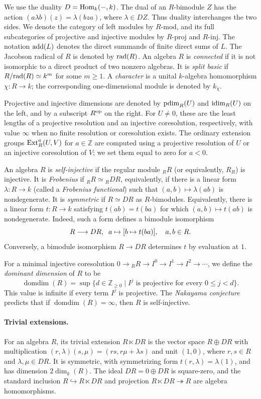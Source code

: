 \documentclass[11pt]{article}
\begin{document}
We use the duality $D={\rm Hom}_k(-,k)$. The dual of an $R$-bimodule $Z$ has
the action $(a\lambda b)(z)=\lambda(bza)$, where $\lambda\in DZ$. Thus duality interchanges the two sides. We denote the category of left modules by $R\text{-}\mathrm{mod}$, and its full
subcategories of projective and injective modules by
$R\text{-}\mathrm{proj}$ and $R\text{-}\mathrm{inj}$. The notation
${\rm add}(L)$ denotes the direct summands of finite direct sums of $L$.
The Jacobson radical of $R$ is denoted by ${\rm rad}(R)$.
An algebra $R$ is \emph{connected} if it is not isomorphic to a direct
product of two nonzero algebras.
It is \emph{split basic} if $R/{\rm rad}(R)\simeq k^m$ for some
$m\ge1$.  A \emph{character} is a unital $k$-algebra homomorphism $\chi:R\to k$; the corresponding
one-dimensional module is denoted by $k_\chi$.

Projective and injective dimensions are denoted by ${\rm pdim}_R(U)$ and
${\rm idim}_R(U)$ on the left, and by a subscript $R^{\rm op}$ on the right.
For $U\ne0$, these are the least lengths of a projective resolution
and an injective coresolution, respectively, with value $\infty$
when no finite resolution or coresolution exists.
The ordinary extension groups ${\rm Ext}_R^a(U,V)$ for $a\in\mathbb{Z}$ are computed using a projective resolution of $U$ or an injective coresolution of $V$; we set them equal to zero for $a<0$.


An algebra $R$ is \emph{self-injective} if the regular module ${_R}R$ (or equivalently, $R_R$)
is injective. It is \emph{Frobenius} if $ {}_RR\simeq {}_RDR$,
equivalently, if there is a linear form $\lambda:R\to k$ (called a \emph{Frobenius functional}) such that
$(a,b)\mapsto\lambda(ab)$ is nondegenerate. It is \emph{symmetric}
if $R\simeq DR$ as $R$-bimodules. Equivalently, there is a linear form
$t:R\to k$ satisfying $t(ab)=t(ba)$ for which
$(a,b)\mapsto t(ab)$ is nondegenerate. Indeed, such a form defines
a bimodule isomorphism
$$R\longrightarrow DR, \;\; a\mapsto[b\mapsto t(ba)],\quad a, b\in R.$$
Conversely, a bimodule isomorphism $R\to DR$ determines $t$ by evaluation at $1$.


For a minimal injective coresolution $0\to {}_RR\to I^0\to I^1\to I^2\to\cdots$, we define the \emph{dominant dimension} of $R$ to be
\[
\operatorname{domdim}(R)=\sup\{d\in\mathbb{Z}_{\ge0}\mid I^j\text{ is projective for every }0\le j<d\}.
\]
This value is infinite if every term $I^j$ is projective.
The \emph{Nakayama conjecture} predicts that
if $\operatorname{domdim}(R)=\infty$, then $R$ is self-injective.

\paragraph{Trivial extensions.}
For an algebra $R$, its trivial extension $R\ltimes DR$ is
the vector space $R\oplus DR$ with multiplication
$(r,\lambda)(s,\mu)=(rs,r\mu+\lambda s)$ and unit $(1,0)$, where $r,s \in R$ and $\lambda,\mu\in DR$.
It is symmetric, with symmetrizing form $t(r,\lambda)=\lambda(1)$,
and has dimension $2\dim_k(R)$. The ideal $DR=0\oplus DR$ is
square-zero, and the standard inclusion $R\hookrightarrow R\ltimes DR$
and projection $R\ltimes DR\twoheadrightarrow R$ are algebra homomorphisms.
\end{document}

